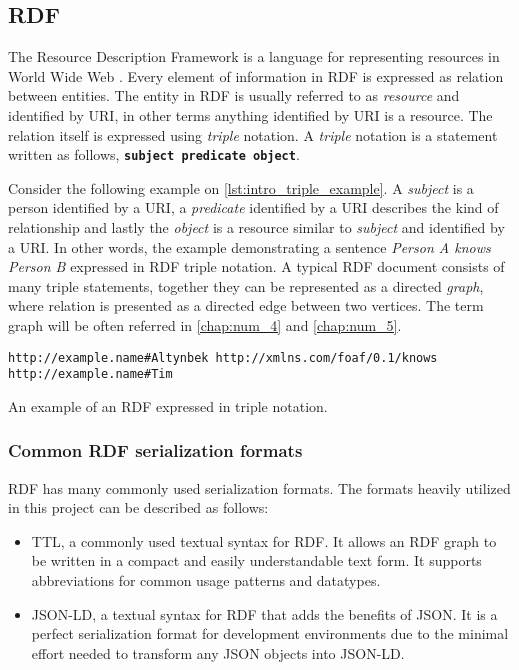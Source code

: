 \subsection{RDF}

The Resource Description Framework is a language for representing resources in World Wide Web \cite{rdf}\cite{rdf_primer}. Every element of information in RDF is expressed as relation between entities. The entity in RDF is usually referred to as \textit{resource} and identified by \acrfull{URI}, in other terms anything identified by \acrfull{URI} is a resource. The relation itself is expressed using \textit{triple} notation. A \textit{triple} notation is a statement written as follows, \texttt{\textbf{subject} \textbf{predicate} \textbf{object}}.

Consider the following example on \autoref{lst:intro_triple_example}. A \textit{subject} is a person identified by a URI, a \textit{predicate} identified by a URI describes the kind of relationship and lastly the \textit{object} is a resource similar to \textit{subject} and identified by a URI. In other words, the example demonstrating a sentence \textit{Person A knows Person B} expressed in RDF triple notation. A typical RDF document consists of many triple statements, together they can be represented as a directed \textit{graph}, where relation is presented as a directed edge between two vertices. The term graph will be often referred in \autoref{chap:num_4}  and \autoref{chap:num_5}.
 
\begin{listing}[ht]    
\begin{verbatim}
http://example.name#Altynbek http://xmlns.com/foaf/0.1/knows http://example.name#Tim
\end{verbatim}
\caption{An example of an RDF expressed in triple notation.} 
\label{lst:intro_triple_example}
\end{listing}

\subsubsection{Common RDF serialization formats}

RDF has many commonly used serialization formats. The formats heavily utilized in this project can be described as follows:
\begin{itemize}
	\item \acrfull{TTL}, a commonly used textual syntax for RDF. It allows an RDF graph to be written in a compact and easily understandable text form. It supports abbreviations for common usage patterns and datatypes.
	\item \acrfull{JSON-LD}, a textual syntax for RDF that adds the benefits of JSON. It is a perfect serialization format for development environments due to the minimal effort needed to transform any JSON objects into JSON-LD. 
\end{itemize}


